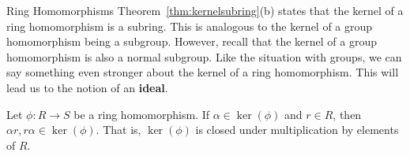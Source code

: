 \begin{section}{Ring Homomorphisms}
Theorem~\ref{thm:kernelsubring}(b) states that the kernel of a ring homomorphism is a subring. This is analogous to the kernel of a group homomorphism being a subgroup. However, recall that the kernel of a group homomorphism is also a normal subgroup. Like the situation with groups, we can say something even stronger about the kernel of a ring homomorphism. This will lead us to the notion of an \textbf{ideal}.

\begin{theorem}
Let $\phi:R\to S$ be a ring homomorphism.  If $\alpha\in\ker(\phi)$ and $r\in R$, then $\alpha r, r\alpha\in \ker(\phi)$.  That is, $\ker(\phi)$ is closed under multiplication by elements of $R$.
\end{theorem}

\end{section}

